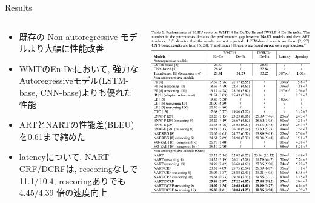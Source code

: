 \documentclass[unicode, 12pt, aspectratio=43]{beamer}
\begin{document}
\begin{frame}[label={sec:orgc1d6b4a}]{Results}
\begin{columns}
\begin{column}{0.35\columnwidth}
\fontsize{9.5pt}{0pt}
\begin{itemize}
\item 既存の Non-autoregressive モデルより大幅に性能改善
\item WMTのEn-Deにおいて, 強力なAutoregressiveモデル(LSTM-base, CNN-base)よりも優れた性能
\item ARTとNARTの性能差(BLEU)を0.61まで縮めた
\item latencyについて, NART-CRF/DCRFは, rescoringなしで 11.1/10.4, rescoringありでも4.45/4.39  倍の速度向上
\end{itemize}
\end{column}


\begin{column}{0.65\columnwidth}
\begin{center}
\includegraphics[width=1.0\linewidth]{./figure/Table2.pdf}
\end{center}
\end{column}
\end{columns}
\end{frame}
\end{document}
